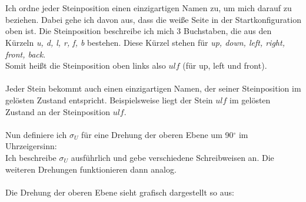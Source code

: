 \documentclass[12pt,a4paper, usenames, dvipsnames]{scrartcl}
\begin{document}
\ \\
\\
Ich ordne jeder Steinposition einen einzigartigen Namen zu, um mich darauf zu beziehen. Dabei gehe ich davon aus, dass die weiße Seite in der Startkonfiguration oben ist. Die Steinposition beschreibe ich mich 3 Buchstaben, die aus den Kürzeln \textit{u, d, l, r, f, b} bestehen. Diese Kürzel stehen für \textit{up, down, left, right, front, back}. \\
Somit heißt die Steinposition oben links also $ulf$ (für up, left und front). 
\\
\\
Jeder Stein bekommt auch einen einzigartigen Namen, der seiner Steinposition im gelösten Zustand entspricht. Beispielsweise liegt der Stein $ulf$ im gelösten Zustand an der Steinposition $ulf$.
\\ 
\\
Nun definiere ich $\sigma_U$ für eine Drehung der oberen Ebene um 90$^\circ$ im Uhrzeigersinn: \\
Ich beschreibe $\sigma_U$ ausführlich und gebe verschiedene Schreibweisen an. Die weiteren Drehungen funktionieren dann analog. \\
\\
Die Drehung der oberen Ebene sieht grafisch dargestellt so aus: \\
\end{document}
